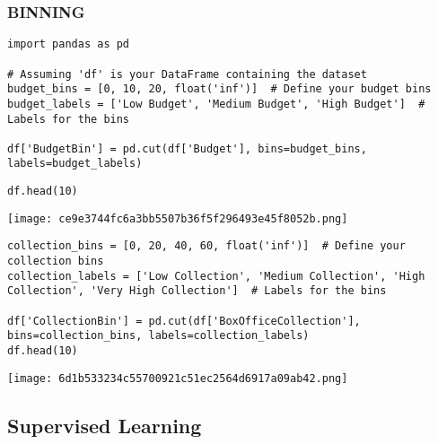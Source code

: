 \documentclass[11pt]{article}
\begin{document}
\subsubsection{BINNING}
\label{sec:org28726de}
\begin{verbatim}
import pandas as pd

# Assuming 'df' is your DataFrame containing the dataset
budget_bins = [0, 10, 20, float('inf')]  # Define your budget bins
budget_labels = ['Low Budget', 'Medium Budget', 'High Budget']  # Labels for the bins

df['BudgetBin'] = pd.cut(df['Budget'], bins=budget_bins, labels=budget_labels)
\end{verbatim}

\begin{verbatim}
df.head(10)
\end{verbatim}

\begin{center}
\texttt{[image: ce9e3744fc6a3bb5507b36f5f296493e45f8052b.png]}
\end{center}

\begin{verbatim}
collection_bins = [0, 20, 40, 60, float('inf')]  # Define your collection bins
collection_labels = ['Low Collection', 'Medium Collection', 'High Collection', 'Very High Collection']  # Labels for the bins

df['CollectionBin'] = pd.cut(df['BoxOfficeCollection'], bins=collection_bins, labels=collection_labels)
df.head(10)
\end{verbatim}

\begin{center}
\texttt{[image: 6d1b533234c55700921c51ec2564d6917a09ab42.png]}
\end{center}
\subsection{Supervised Learning}
\label{sec:org3d967c2}
\end{document}
